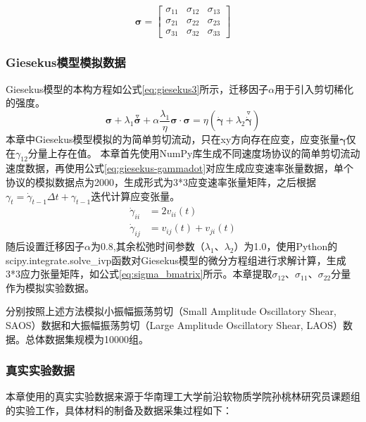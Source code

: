 \begin{equation}
  \boldsymbol{\sigma} = \begin{bmatrix}
    \sigma_{11} & \sigma_{12} & \sigma_{13} \\
    \sigma_{21} & \sigma_{22} & \sigma_{23} \\
    \sigma_{31} & \sigma_{32} & \sigma_{33}
  \end{bmatrix} \label{eq:sigma_bmatrix}
\end{equation}

\subsubsection{Giesekus模型模拟数据}
Giesekus模型的本构方程如公式\eqref{eq:giesekus3}所示，迁移因子$\alpha$用于引入剪切稀化的强度。
\begin{equation}
  \boldsymbol{\sigma} + \lambda_1 \stackrel{\triangledown}{\boldsymbol{\sigma}} + \alpha \frac{\lambda_1}{\eta} \boldsymbol{\sigma} \cdot \boldsymbol{\sigma} = \eta \left( \dot{\boldsymbol{\gamma}} + \lambda_2 \stackrel{\triangledown}{\dot{\boldsymbol{\gamma}}} \right) \label{eq:giesekus3}
\end{equation}
本章中Giesekus模型模拟的为简单剪切流动，只在xy方向存在应变，应变张量$\boldsymbol{\gamma}$仅在$\gamma_{12}$分量上存在值。
本章首先使用NumPy库生成不同速度场协议的简单剪切流动速度数据，再使用公式\eqref{eq:giesekus-gammadot}对应生成应变速率张量数据，单个协议的模拟数据点为2000，生成形式为3*3应变速率张量矩阵，之后根据$\gamma_{t}=\dot{\gamma}_{t-1}\Delta t+\gamma_{t-1}$迭代计算应变张量。
\begin{equation}
  \begin{aligned}
    \dot{\gamma}_{ii} & = 2 v_{ii}(t)           \\
    \dot{\gamma}_{ij} & = v_{ij}(t) + v_{ji}(t)
  \end{aligned} \label{eq:giesekus-gammadot}
\end{equation}
随后设置迁移因子$\alpha$为0.8,其余松弛时间参数（$\lambda_1$、$\lambda_2$）为1.0，使用Python的scipy.integrate.solve\_ivp函数对Giesekus模型的微分方程组进行求解计算，生成3*3应力张量矩阵，如公式\eqref{eq:sigma_bmatrix}所示。本章提取$\sigma_{12}$、$\sigma_{11}$、$\sigma_{22}$分量作为模拟实验数据。

分别按照上述方法模拟小振幅振荡剪切（Small Amplitude Oscillatory Shear, SAOS）数据和大振幅振荡剪切（Large Amplitude Oscillatory Shear, LAOS）数据。总体数据集规模为10000组。
\subsubsection{真实实验数据}
本章使用的真实实验数据来源于华南理工大学前沿软物质学院孙桃林研究员课题组的实验工作，具体材料的制备及数据采集过程如下：

